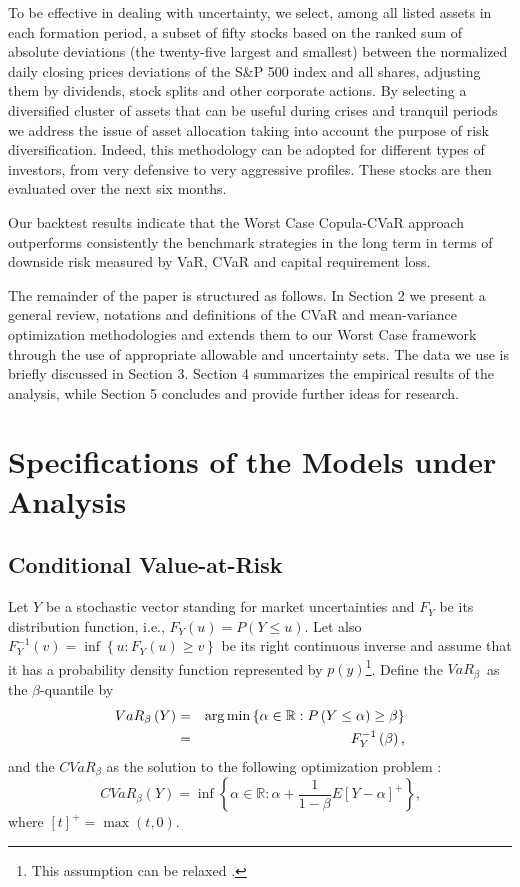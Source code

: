 \documentclass[a4paper,10pt]{article}
\begin{document}
To be effective in dealing with uncertainty, we select, among all listed assets in each formation period, a subset of fifty stocks based on the ranked sum of absolute deviations (the twenty-five largest and smallest) between the normalized daily closing prices deviations of the S\&P 500 index and all shares, adjusting them by dividends, stock splits and other corporate actions. By selecting a diversified cluster of assets that can be useful during crises and tranquil periods we address the issue of asset allocation taking into account the purpose of risk diversification. Indeed, this methodology can be adopted for different types of investors, from very defensive to very aggressive profiles. These stocks are then evaluated over the next six months.

Our backtest results indicate that the Worst Case Copula-CVaR approach outperforms consistently the benchmark strategies in the long term in terms of downside risk measured by VaR, CVaR and capital requirement loss. 

The remainder of the paper is structured as follows. In Section 2 we present a general review, notations and definitions of the CVaR and mean-variance optimization methodologies and extends them to our Worst Case framework through the use of appropriate allowable and uncertainty sets. The data we use is briefly discussed in Section 3. Section 4 summarizes the empirical results of the analysis, while Section 5 concludes and provide further ideas for research.

\section{Specifications of the Models under Analysis}

\label{section2}

\subsection{Conditional Value-at-Risk}

Let $Y$ be a stochastic vector standing for market uncertainties and $F_{Y}$ be its distribution function, i.e., $F_{Y}\left( u\right) =P\left( Y\leq u\right) $. Let also $F_{Y}^{-1}\left( v\right) =\inf \left\{ u:F_{Y}\left(u\right) \geq v\right\} $ be its right continuous inverse and assume that it has a probability density function represented by $p(y)$\footnote{This assumption can be relaxed \citep{uryasev2013}.}. Define the $VaR_{\beta }$\thinspace\ as the $\beta $-quantile by 
\begin{eqnarray}
VaR_{\beta }\left( Y\right) &=& \arg \min \left\{ \alpha \in\mathbb{R}:P\left( Y\leq \alpha \right) \geq \beta \right\}  \label{one} \\
&=&F_{Y}^{-1}\left( \beta \right) \text{,}  \notag
\end{eqnarray}
and the $CVaR_{\beta }$ as the solution to the following optimization problem \citep{pflug2000}:
\begin{equation}
CVaR_{\beta }\left( Y\right) =\inf \left\{ \alpha \in\mathbb{R}:\alpha +\frac{1}{1-\beta }E\left[ Y-\alpha \right] ^{+}\right\} \text{,}
\label{two}
\end{equation}
where $\left[ t\right] ^{+}=\max \left( t,0\right) $.
\end{document}
